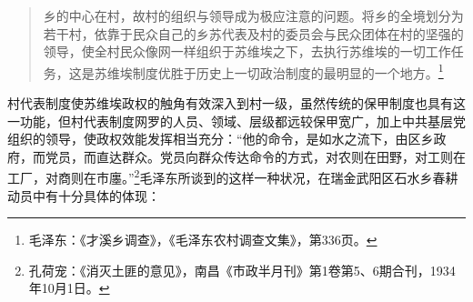 \begin{quote}

乡的中心在村，故村的组织与领导成为极应注意的问题。将乡的全境划分为若干村，依靠于民众自己的乡苏代表及村的委员会与民众团体在村的坚强的领导，使全村民众像网一样组织于苏维埃之下，去执行苏维埃的一切工作任务，这是苏维埃制度优胜于历史上一切政治制度的最明显的一个地方。\footnote{毛泽东：《才溪乡调查》，《毛泽东农村调查文集》，第336页。}
\end{quote}


村代表制度使苏维埃政权的触角有效深入到村一级，虽然传统的保甲制度也具有这一功能，但村代表制度网罗的人员、领域、层级都远较保甲宽广，加上中共基层党组织的领导，使政权效能发挥相当充分：“他的命令，是如水之流下，由区乡政府，而党员，而直达群众。党员向群众传达命令的方式，对农则在田野，对工则在工厂，对商则在市廛。”\footnote{孔荷宠：《消灭土匪的意见》，南昌《市政半月刊》第1卷第5、6期合刊，1934年10月1日。}毛泽东所谈到的这样一种状况，在瑞金武阳区石水乡春耕动员中有十分具体的体现：

